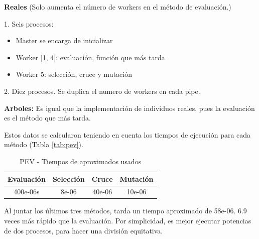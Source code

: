 		\begin{flushleft}
		\begin{mdframed}[roundcorner=5pt]					
			\normalsize		
			\textbf{Reales} \small (Solo aumenta el número de workers en el método de evaluación.)	
			
			
			\normalsize		
			\color{darkgreen} 1. Seis procesos: \color{black}
			\vspace{-0.3cm}
			\scriptsize
			\begin{itemize}			
				\item Master se encarga de inicializar
				\vspace{-0.1cm}
				\item Worker [1, 4]: evaluación, función que más tarda			
				\vspace{-0.1cm}
				\item Worker 5:  selección, cruce y mutación						
				\vspace{-0.1cm}
			\end{itemize}
			\small
			\color{blue} 2. Diez procesos. \color{black} \scriptsize Se duplica el numero de workers en cada pipe.
			
			\vspace{0.2cm}
			\normalsize
			\textbf{Arboles:} \small Es igual que la implementación de individuos reales, pues la evaluación es el método que más tarda.			
		\end{mdframed}
		\end{flushleft}



		\begin{flushleft}
			Estos datos se calcularon teniendo en cuenta los tiempos de ejecución para cada método (Tabla \ref{tab:pev}).
		\end{flushleft}
		
		\begin{table}[!h]				
		\centering
		\begin{tabular}{|c|c|c|c|}
			\hline
			\rowcolor{lightgray}
			\textbf{Evaluación} & \textbf{Selección} & \textbf{Cruce} & \textbf{Mutación}\\
			\hline
			400e-06s  & 8e-06 & 40e-06 & 10e-06\\ 
			\hline
		\end{tabular}
		\caption{PEV - Tiempos de aproximados usados}
		\label{tab:tiempos_aprox}
		\end{table}
		
		
		Al juntar los últimos tres métodos, tarda un tiempo aproximado de 58e-06. 6.9 veces más rápido que la evaluación. Por simplicidad, es mejor ejecutar potencias de dos procesos, para hacer una división equitativa.
	

